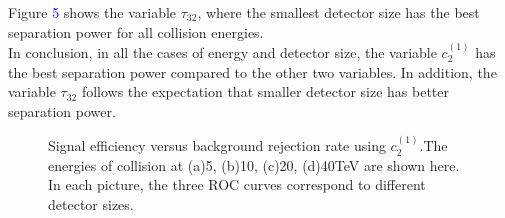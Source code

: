 Figure \textcolor{blue}{5} shows the variable $\tau_{32}$, where the smallest detector size has the best separation power for all collision energies.\\

In conclusion, in all the cases of energy and detector size, the variable $c_2^{(1)}$ has the best separation power compared to the other two variables. In addition, the variable $\tau_{32}$ follows the expectation that smaller detector size has better separation power.\\

\label{sec:efficiency}

\begin{figure}
\begin{center}
\end{center}
\caption{Signal efficiency versus background rejection rate using $c_2^{(1)}$.The energies of collision at (a)5, (b)10, (c)20, (d)40TeV are shown here. In each picture, the three ROC curves correspond to different detector sizes.}
\label{fig:cluster_c2b1}
\end{figure}

